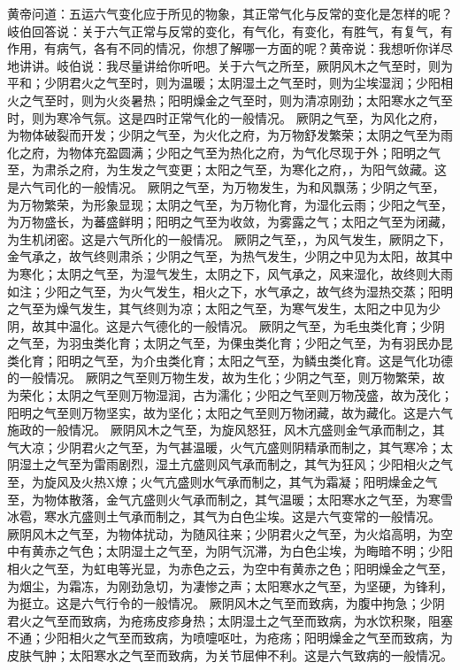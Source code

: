 \documentclass[a4paper,12pt,UTF8,twoside]{ctexbook}
\begin{document}
黄帝问道：五运六气变化应于所见的物象，其正常气化与反常的变化是怎样的呢？岐伯回答说：关于六气正常与反常的变化，有气化，有变化，有胜气，有复气，有作用，有病气，各有不同的情况，你想了解哪一方面的呢？黄帝说：我想听你详尽地讲讲。岐伯说：我尽量讲给你听吧。关于六气之所至，厥阴风木之气至时，则为平和；少阴君火之气至时，则为温暖；太阴湿土之气至时，则为尘埃湿润；少阳相火之气至时，则为火炎暑热；阳明燥金之气至时，则为清凉刚劲；太阳寒水之气至时，则为寒冷气氛。这是四时正常气化的一般情况。
厥阴之气至，为风化之府，为物体破裂而开发；少阴之气至，为火化之府，为万物舒发繁荣；太阴之气至为雨化之府，为物体充盈圆满；少阳之气至为热化之府，为气化尽现于外；阳明之气至，为肃杀之府，为生发之气变更；太阳之气至，为寒化之府，，为阳气敛藏。这是六气司化的一般情况。
厥阴之气至，为万物发生，为和风飘荡；少阴之气至，为万物繁荣，为形象显现；太阴之气至，为万物化育，为湿化云雨；少阳之气至，为万物盛长，为蕃盛鲜明；阳明之气至为收敛，为雾露之气；太阳之气至为闭藏，为生机闭密。这是六气所化的一般情况。
厥阴之气至，，为风气发生，厥阴之下，金气承之，故气终则肃杀；少阴之气至，为热气发生，少阴之中见为太阳，故其中为寒化；太阴之气至，为湿气发生，太阴之下，风气承之，风来湿化，故终则大雨如注；少阳之气至，为火气发生，相火之下，水气承之，故气终为湿热交蒸；阳明之气至为燥气发生，其气终则为凉；太阳之气至，为寒气发生，太阳之中见为少阴，故其中温化。这是六气德化的一般情况。
厥阴之气至，为毛虫类化育；少阴之气至，为羽虫类化育；太阴之气至，为倮虫类化育；少阳之气至，为有羽民办昆类化育；阳明之气至，为介虫类化育；太阳之气至，为鳞虫类化育。这是气化功德的一般情况。
厥阴之气至则万物生发，故为生化；少阴之气至，则万物繁荣，故为荣化；太阴之气至则万物湿润，古为濡化；少阳之气至则万物茂盛，故为茂化；阳明之气至则万物坚实，故为坚化；太阳之气至则万物闭藏，故为藏化。这是六气施政的一般情况。
厥阴风木之气至，为旋风怒狂，风木亢盛则金气承而制之，其气大凉；少阴君火之气至，为气甚温暖，火气亢盛则阴精承而制之，其气寒冷；太阴湿土之气至为雷雨剧烈，湿土亢盛则风气承而制之，其气为狂风；少阳相火之气至，为旋风及火热X燎；火气亢盛则水气承而制之，其气为霜凝；阳明燥金之气至，为物体散落，金气亢盛则火气承而制之，其气温暖；太阳寒水之气至，为寒雪冰雹，寒水亢盛则土气承而制之，其气为白色尘埃。这是六气变常的一般情况。
厥阴风木之气至，为物体扰动，为随风往来；少阴君火之气至，为火焰高明，为空中有黄赤之气色；太阴湿土之气至，为阴气沉滞，为白色尘埃，为晦暗不明；少阳相火之气至，为虹电等光显，为赤色之云，为空中有黄赤之色；阳明燥金之气至，为烟尘，为霜冻，为刚劲急切，为凄惨之声；太阳寒水之气至，为坚硬，为锋利，为挺立。这是六气行令的一般情况。
厥阴风木之气至而致病，为腹中拘急；少阴君火之气至而致病，为疮疡皮疹身热；太阴湿土之气至而致病，为水饮积聚，阻塞不通；少阳相火之气至而致病，为喷嚏呕吐，为疮疡；阳明燥金之气至而致病，为皮肤气肿；太阳寒水之气至而致病，为关节屈伸不利。这是六气致病的一般情况。
\end{document}
